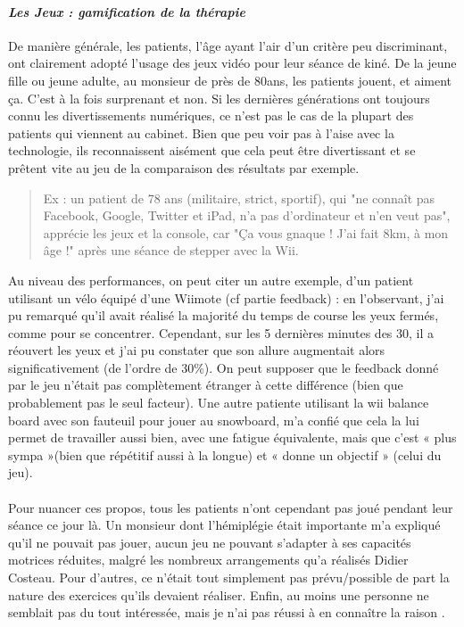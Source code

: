 		\paragraph{\emph{Les Jeux : gamification de la thérapie}\\}
De manière générale, les patients, l'âge ayant l'air d'un critère peu discriminant, ont clairement adopté l'usage des jeux vidéo pour leur séance de kiné. De la jeune fille ou jeune adulte, au monsieur de près de 80ans, les patients jouent, et aiment ça. C'est à la fois surprenant et non. Si les dernières générations ont toujours connu les divertissements numériques, ce n'est pas le cas de la plupart des patients qui viennent au cabinet. Bien que peu voir pas à l'aise avec la technologie, ils reconnaissent aisément que cela peut être divertissant et se prêtent vite au jeu de la comparaison des résultats par exemple.
\begin{quotation}
Ex : un patient de 78 ans (militaire, strict, sportif), qui "ne connaît pas Facebook, Google, Twitter et iPad, n'a pas d'ordinateur et n'en veut pas", apprécie les jeux et la console, car "Ça vous gnaque ! J'ai fait 8km, à mon âge !" après une séance de stepper avec la Wii.    
\end{quotation}
Au niveau des performances, on peut citer un autre exemple, d'un patient utilisant un vélo équipé d'une Wiimote (cf partie feedback) : en l'observant, j'ai pu remarqué qu'il avait réalisé la majorité du temps de course les yeux fermés, comme pour se concentrer. Cependant, sur les 5 dernières minutes des 30, il a réouvert les yeux et j'ai pu constater que son allure augmentait alors significativement (de l'ordre de 30\%). On peut supposer que le feedback donné par le jeu n'était pas complètement étranger à cette différence (bien que probablement pas le seul facteur).    
Une autre patiente utilisant la wii balance board avec son fauteuil pour jouer au snowboard, m'a confié que cela la lui permet de travailler aussi bien, avec une fatigue équivalente, mais que c'est « plus sympa »(bien que répétitif aussi à la longue) et « donne un objectif » (celui du jeu).

\paragraph{}Pour nuancer ces propos, tous les patients n'ont cependant pas joué pendant leur séance ce jour là. Un monsieur dont l'hémiplégie était importante m'a expliqué qu'il ne pouvait pas jouer, aucun jeu ne pouvant s'adapter à ses capacités motrices réduites, malgré les nombreux arrangements qu'a réalisés Didier Costeau. Pour d'autres, ce n'était tout simplement pas prévu/possible de part la nature des exercices qu'ils devaient réaliser. Enfin, au moins une personne ne semblait pas du tout intéressée, mais je n'ai pas réussi à en connaître la raison .

